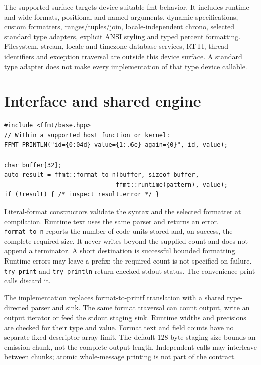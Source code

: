 \documentclass[11pt,letterpaper]{article}
\begin{document}
The supported surface targets device-suitable fmt behavior. It includes
runtime and wide formats, positional and named arguments, dynamic
specifications, custom formatters, ranges/tuples/join, locale-independent
chrono, selected standard type adapters, explicit ANSI styling and typed
percent formatting. Filesystem, stream, locale and timezone-database services,
RTTI, thread identifiers and exception traversal are outside this device
surface. A standard type adapter does not make every implementation of that
type device callable.

\section{Interface and shared engine}

\begin{lstlisting}
#include <ffmt/base.hpp>
// Within a supported host function or kernel:
FFMT_PRINTLN("id={0:04d} value={1:.6e} again={0}", id, value);

char buffer[32];
auto result = ffmt::format_to_n(buffer, sizeof buffer,
                               ffmt::runtime(pattern), value);
if (!result) { /* inspect result.error */ }
\end{lstlisting}

Literal-format constructors validate the syntax and the selected formatter
at compilation. Runtime text uses the same parser and returns an error.
\texttt{format\_to\_n} reports the number of code units stored and, on success,
the complete required size. It never writes beyond the supplied count and
does not append a terminator. A short destination is successful bounded
formatting. Runtime errors may leave a prefix; the required count is not
specified on failure. \texttt{try\_print} and \texttt{try\_println} return
checked stdout status. The convenience print calls discard it.

The implementation replaces format-to-printf translation with a shared
type-directed parser and sink. The same format traversal can count output,
write an output iterator or feed the stdout staging sink. Runtime widths and
precisions are checked for their type and value. Format text and field counts
have no separate fixed descriptor-array limit. The default 128-byte staging
size bounds an emission chunk, not the complete output length. Independent
calls may interleave between chunks; atomic whole-message printing is not
part of the contract.

\begin{center}
\end{center}
\end{document}
